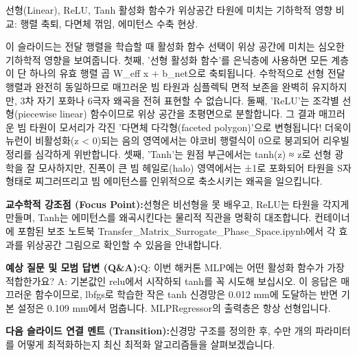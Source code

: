 \documentclass[11pt,a4paper]{article}
\begin{document}
\vspace{0.2em}
\begin{tcolorbox}[colback=lightbg,colframe=bordergray,title={\footnotesize\bfseries\color{darkgray}슬라이드 시각 구성 요약},fontupper=\small,left=6pt,right=6pt,top=2.5pt,bottom=2.5pt,boxrule=0.6pt,arc=2.5pt]
선형(Linear), ReLU, Tanh 활성화 함수가 위상공간 타원에 미치는 기하학적 영향 비교: 행렬 축퇴, 다면체 꺾임, 에미턴스 수축 현상.
\end{tcolorbox}
\vspace{0.2em}
\begin{tcolorbox}[colback=white,colframe=primaryblue,title={\footnotesize\bfseries\color{white}발표자 구두 대본 (Spoken Script)},fontupper=\small,left=6pt,right=6pt,top=3pt,bottom=3pt,boxrule=0.8pt,arc=2.5pt]
이 슬라이드는 전달 행렬을 학습할 때 활성화 함수 선택이 위상 공간에 미치는 심오한 기하학적 영향을 보여줍니다. 첫째, '선형 활성화 함수'를 은닉층에 사용하면 모든 계층이 단 하나의 유효 행렬 곱 W\_eff x + b\_net으로 축퇴됩니다. 수학적으로 선형 전달 행렬과 완전히 동일하므로 매끄러운 빔 타원과 심플렉틱 면적 보존을 완벽히 유지하지만, 3차 자기 포화나 6극자 왜곡을 전혀 표현할 수 없습니다. 둘째, 'ReLU'는 조각별 선형(piecewise linear) 함수이므로 위상 공간을 초평면으로 분할합니다. 그 결과 매끄러운 빔 타원이 모서리가 각진 '다면체 다각형(faceted polygon)'으로 변형됩니다! 더욱이 뉴런이 비활성화(z < 0)되는 음의 영역에서는 야코비 행렬식이 0으로 붕괴되어 리우빌 정리를 심각하게 위반합니다. 셋째, 'Tanh'는 원점 부근에서는 tanh(z) ≈ z로 선형 광학을 잘 모사하지만, 진폭이 큰 빔 헤일로(halo) 영역에서는 ±1로 포화되어 타원을 S자 형태로 찌그러뜨리고 빔 에미턴스를 인위적으로 축소시키는 왜곡을 일으킵니다.
\end{tcolorbox}
\vspace{0.2em}
\begin{tcolorbox}[colback=lightbg,colframe=bordergray,left=6pt,right=6pt,top=3pt,bottom=3pt,boxrule=0.6pt,arc=2.5pt]
\small
\noindent\textbf{\color{navy}교수학적 강조점 (Focus Point):}\enspace 선형은 비선형을 못 배우고, ReLU는 타원을 각지게 만들며, Tanh는 에미턴스를 왜곡시킨다는 물리적 직관을 명확히 대조합니다. 컨테이너에 포함된 보조 노트북 Transfer\_Matrix\_Surrogate\_Phase\_Space.ipynb에서 각 효과를 위상공간 그림으로 확인할 수 있음을 안내합니다.\par\vspace{0.3em}
\noindent\textbf{\color{successgreen}예상 질문 및 모범 답변 (Q\&A):}\enspace Q: 이번 해커톤 MLP에는 어떤 활성화 함수가 가장 적합한가요? A: 기본값인 relu에서 시작하되 tanh를 꼭 시도해 보십시오. 이 응답은 매끄러운 함수이므로, lbfgs로 학습한 작은 tanh 신경망은 0.012 mm에 도달하는 반면 기본 설정은 0.109 mm에서 멈춥니다. MLPRegressor의 출력층은 항상 선형입니다.\par\vspace{0.3em}
\noindent\textbf{\color{accent}다음 슬라이드 연결 멘트 (Transition):}\enspace 신경망 구조를 정의한 후, 수만 개의 파라미터를 어떻게 최적화하는지 최신 최적화 알고리즘들을 살펴보겠습니다.
\end{tcolorbox}
\end{document}
